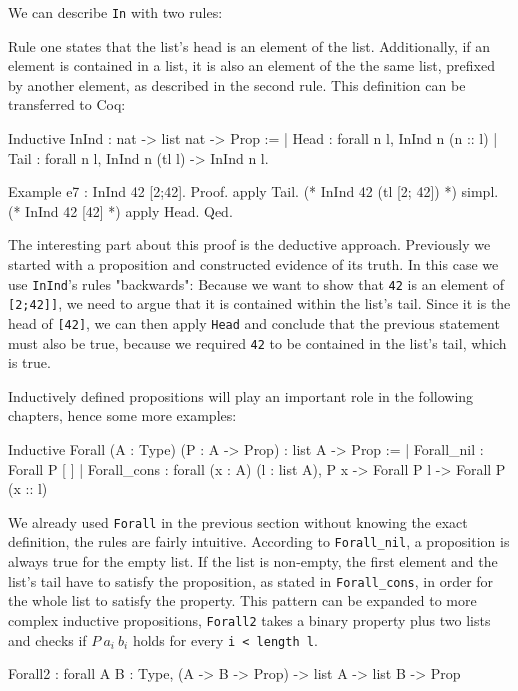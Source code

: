 \documentclass[fleqn, abstract=on]{scrreprt}
\newcommand{\coqinline}[1]{\texttt{#1}}
\begin{document}
\par
We can describe \coqinline{In} with two rules:
\begin{figure}[H]
	\begin{center}
		\begin{minipage}{.45 \linewidth}
			\infer[1]{\coqinline{In n (n :: l)}}{\phantom{premise}}
		\end{minipage}
		\hspace{.1 \linewidth}
		\begin{minipage}{.45 \linewidth}
			\infer[2]{\coqinline{In n (e :: l)}}{\coqinline{In n l}}
		\end{minipage}
	\end{center}
	\vspace*{-1em}
\end{figure}
Rule one states that the list's head is an element of the list. Additionally, if an element is contained in a list, it is also an element of the the same list, prefixed by another element, as described in the second rule. This definition can be transferred to Coq:
\begin{coqcode}
Inductive InInd : nat -> list nat -> Prop :=
| Head : forall n l, InInd n (n :: l)
| Tail : forall n l, InInd n (tl l) -> InInd n l.
\end{coqcode}
\begin{coqcode}
Example e7 : InInd 42 [2;42].
Proof. 
  apply Tail.  (* InInd 42 (tl [2; 42]) *)
  simpl.       (* InInd 42 [42] *)
  apply Head.
Qed.           
\end{coqcode}
The interesting part about this proof is the deductive approach. Previously we started with a proposition and constructed evidence of its truth. In this case we use \coqinline{InInd}'s rules "backwards": Because we want to show that \coqinline{42} is an element of \coqinline{[2;42]]}, we need to argue that it is contained within the list's tail. Since it is the head of \coqinline{[42]}, we can then apply \coqinline{Head} and conclude that the previous statement must also be true, because we required \coqinline{42} to be contained in the list's tail, which is true.
\par
Inductively defined propositions will play an important role in the following chapters, hence some more examples:
\begin{coqcode}
Inductive Forall (A : Type) (P : A -> Prop) : list A -> Prop :=
| Forall_nil : Forall P [ ]
| Forall_cons : forall (x : A) (l : list A), P x -> Forall P l -> Forall P (x :: l)
\end{coqcode}
We already used \coqinline{Forall} in the previous section without knowing the exact definition, the rules are fairly intuitive. According to \coqinline{Forall_nil}, a proposition is always true for the empty list. If the list is non-empty, the first element and the list's tail have to satisfy the proposition, as stated in \coqinline{Forall_cons}, in order for the whole list to satisfy the property. This pattern can be expanded to more complex inductive propositions, \coqinline{Forall2} takes a binary property plus two lists and checks if $P ~ a_{i} ~ b_{i}$ holds for every \coqinline{i < length l}.
\begin{coqcode}
Forall2 : forall A B : Type, (A -> B -> Prop) -> list A -> list B -> Prop
\end{coqcode}
\end{document}
